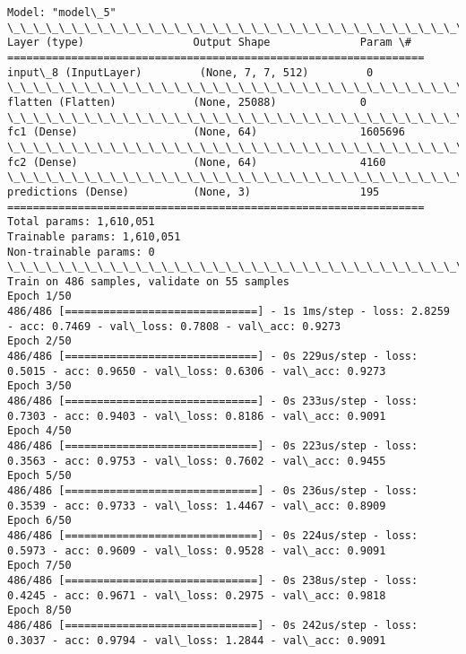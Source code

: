 \documentclass[11pt]{article}
\begin{document}
    \begin{Verbatim}[commandchars=\\\{\}]
Model: "model\_5"
\_\_\_\_\_\_\_\_\_\_\_\_\_\_\_\_\_\_\_\_\_\_\_\_\_\_\_\_\_\_\_\_\_\_\_\_\_\_\_\_\_\_\_\_\_\_\_\_\_\_\_\_\_\_\_\_\_\_\_\_\_\_\_\_\_
Layer (type)                 Output Shape              Param \#   
=================================================================
input\_8 (InputLayer)         (None, 7, 7, 512)         0         
\_\_\_\_\_\_\_\_\_\_\_\_\_\_\_\_\_\_\_\_\_\_\_\_\_\_\_\_\_\_\_\_\_\_\_\_\_\_\_\_\_\_\_\_\_\_\_\_\_\_\_\_\_\_\_\_\_\_\_\_\_\_\_\_\_
flatten (Flatten)            (None, 25088)             0         
\_\_\_\_\_\_\_\_\_\_\_\_\_\_\_\_\_\_\_\_\_\_\_\_\_\_\_\_\_\_\_\_\_\_\_\_\_\_\_\_\_\_\_\_\_\_\_\_\_\_\_\_\_\_\_\_\_\_\_\_\_\_\_\_\_
fc1 (Dense)                  (None, 64)                1605696   
\_\_\_\_\_\_\_\_\_\_\_\_\_\_\_\_\_\_\_\_\_\_\_\_\_\_\_\_\_\_\_\_\_\_\_\_\_\_\_\_\_\_\_\_\_\_\_\_\_\_\_\_\_\_\_\_\_\_\_\_\_\_\_\_\_
fc2 (Dense)                  (None, 64)                4160      
\_\_\_\_\_\_\_\_\_\_\_\_\_\_\_\_\_\_\_\_\_\_\_\_\_\_\_\_\_\_\_\_\_\_\_\_\_\_\_\_\_\_\_\_\_\_\_\_\_\_\_\_\_\_\_\_\_\_\_\_\_\_\_\_\_
predictions (Dense)          (None, 3)                 195       
=================================================================
Total params: 1,610,051
Trainable params: 1,610,051
Non-trainable params: 0
\_\_\_\_\_\_\_\_\_\_\_\_\_\_\_\_\_\_\_\_\_\_\_\_\_\_\_\_\_\_\_\_\_\_\_\_\_\_\_\_\_\_\_\_\_\_\_\_\_\_\_\_\_\_\_\_\_\_\_\_\_\_\_\_\_
Train on 486 samples, validate on 55 samples
Epoch 1/50
486/486 [==============================] - 1s 1ms/step - loss: 2.8259 - acc: 0.7469 - val\_loss: 0.7808 - val\_acc: 0.9273
Epoch 2/50
486/486 [==============================] - 0s 229us/step - loss: 0.5015 - acc: 0.9650 - val\_loss: 0.6306 - val\_acc: 0.9273
Epoch 3/50
486/486 [==============================] - 0s 233us/step - loss: 0.7303 - acc: 0.9403 - val\_loss: 0.8186 - val\_acc: 0.9091
Epoch 4/50
486/486 [==============================] - 0s 223us/step - loss: 0.3563 - acc: 0.9753 - val\_loss: 0.7602 - val\_acc: 0.9455
Epoch 5/50
486/486 [==============================] - 0s 236us/step - loss: 0.3539 - acc: 0.9733 - val\_loss: 1.4467 - val\_acc: 0.8909
Epoch 6/50
486/486 [==============================] - 0s 224us/step - loss: 0.5973 - acc: 0.9609 - val\_loss: 0.9528 - val\_acc: 0.9091
Epoch 7/50
486/486 [==============================] - 0s 238us/step - loss: 0.4245 - acc: 0.9671 - val\_loss: 0.2975 - val\_acc: 0.9818
Epoch 8/50
486/486 [==============================] - 0s 242us/step - loss: 0.3037 - acc: 0.9794 - val\_loss: 1.2844 - val\_acc: 0.9091

\end{Verbatim}
\end{document}

